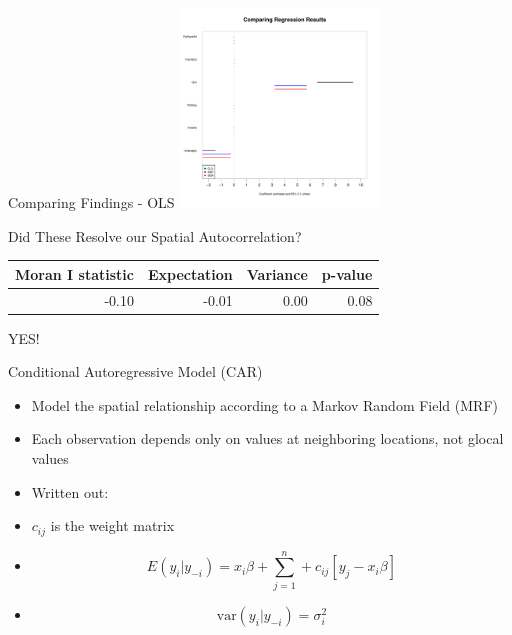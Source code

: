 \documentclass[aspectratio = 169, 12pt]{beamer}\usepackage[]{graphicx}\usepackage[]{color}
\newenvironment{knitrout}{}{} %
\begin{document}
\begin{frame}[fragile]{Comparing Findings - OLS}
\begin{knitrout}\tiny
{}\color{fgcolor}
\includegraphics[width=200px]{figure/unnamed-chunk-14-1} 

\end{knitrout}
\end{frame}

\begin{frame}[fragile]{Did These Resolve our Spatial Autocorrelation?}
\begin{table}[ht]
\centering
\begin{tabular}{rrrr}
  \hline
Moran I statistic & Expectation & Variance & p-value \\ 
  \hline
-0.10 & -0.01 & 0.00 & 0.08 \\ 
   \hline
\end{tabular}
\label{tab:moranresid2}
\end{table}

YES!
\end{frame}

\begin{frame}{Conditional Autoregressive Model (CAR)}
\begin{itemize}
\item Model the spatial relationship according to a Markov Random Field (MRF)
\item Each observation depends only on values at neighboring locations, not glocal values
\item Written out:
\item $c_{ij}$ is the weight matrix
\item $$ E(y_i | y_{-i}) = x_i \beta + \sum_{j=1}^n + c_{ij} [ y_j - x_i \beta ] $$
\item $$ \text{var}(y_i | y_{-i}) = \sigma_{i}^2 $$
\end{itemize}
\end{frame}
\end{document}
